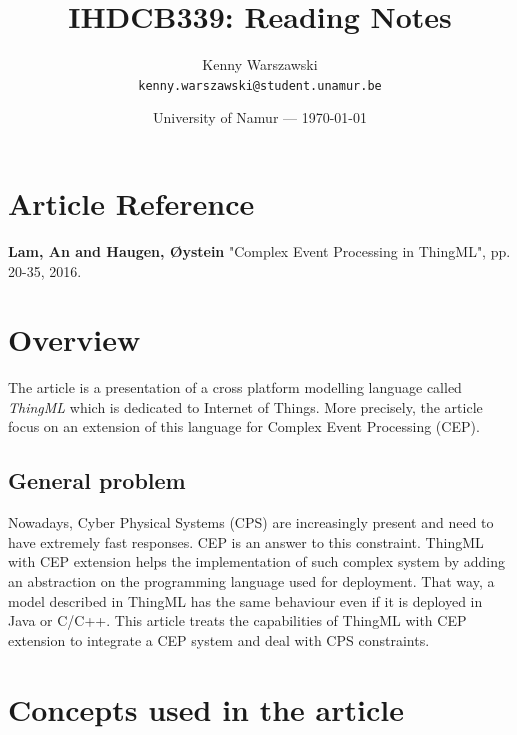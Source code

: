 \documentclass{article}
\title{IHDCB339: Reading Notes}
\author{Kenny Warszawski\\ \texttt{kenny.warszawski@student.unamur.be}}
\date{University of Namur --- \today}
\begin{document}
\maketitle 

\section{Article Reference}

\textbf{Lam, An and Haugen, Øystein} "Complex Event Processing in ThingML", pp. 20-35, 2016.

\section{Overview}

The article is a presentation of a cross platform modelling language called \textit{ThingML} which is dedicated to Internet of Things. More precisely, the article focus on an extension of this language for Complex Event Processing (CEP). 


\subsection{General problem}

Nowadays, Cyber Physical Systems (CPS) are increasingly present and need to have extremely fast responses. CEP is an answer to this constraint. ThingML with CEP extension helps the implementation of such complex system by adding an abstraction on the programming language used for deployment. That way, a model described in ThingML has the same behaviour even if it is deployed in Java or C/C++. This article treats the capabilities of ThingML with CEP extension to integrate a CEP system and deal with CPS constraints.


\section{Concepts used in the article}
\end{document}
